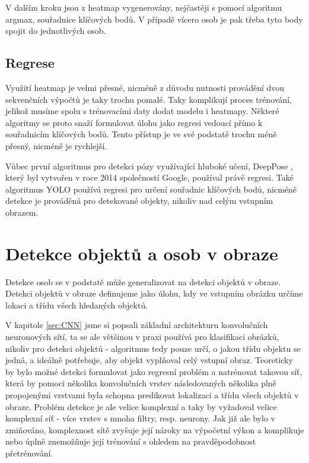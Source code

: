 V dalším kroku jsou z heatmap vygenerovány, nejčastěji s pomocí algoritmu
argmax, souřadnice klíčových bodů. V případě vícero osob je pak třeba tyto body
spojit do jednotlivých osob.

\subsection{Regrese}

Využití heatmap je velmi přesné, nicméně z důvodu nutnosti provádění dvou
sekvenčních výpočtů je taky trochu pomalé. Taky komplikují proces trénování,
jelikož musíme spolu s trénovacími daty dodat modelu i heatmapy. Některé
algoritmy se proto snaží formulovat úlohu jako regresi vedoucí přímo k
souřadnicím klíčových bodů. Tento přístup je ve své podstatě trochu méně
přesný, nicméně je rychlejší.

Vůbec první algoritmus pro detekci pózy využívající hluboké učení, DeepPose
\cite{deeppose}, který byl vytvořen v roce 2014 společností Google, používal
právě regresi. Také algoritmus YOLO používá regresi pro určení souřadnic
klíčových bodů, nicméně detekce je prováděná pro detekované objekty, nikoliv
nad celým vstupním obrazem. \cite{yolo-pose}


\section{Detekce objektů a osob v obraze}
\label{sec:obj_det}

Detekce osob se v podstatě může generalizovat na detekci objektů v obraze.
Detekci objektů v obraze definujeme jako úlohu, kdy ve vstupním obrázku určíme
lokaci a třídu všech hledaných objektů.

V kapitole \ref{sec:CNN} jsme si popsali základní architekturu konvolučních
neuronových sítí, ta se ale většinou v praxi používá pro klasifikaci obrázků,
nikoliv pro detekci objektů - algoritmus tedy pouze určí, o jakou třídu objektu
se jedná, a ideálně potřebuje, aby objekt vyplňoval celý vstupní obraz.
Teoreticky by bylo možné detekci formulovat jako regresní problém a natrénovat
takovou síť, která by pomoci několika konvolučních vrstev následovaných
několika plně propojenými vrstvami byla schopna predikovat lokalizaci a třídu
všech objektů v obraze. \cite{szegedy} Problém detekce je ale velice komplexní
a taky by vyžadoval velice komplexní síť - více vrstev s mnoha filtry, resp.
neurony. Jak již ale bylo v zmiňováno, komplexnost sítě zvyšuje její nároky na
výpočetní výkon a komplikuje nebo úplně znemožňuje její trénování s ohledem na
pravděpodobnost přetrénování.

